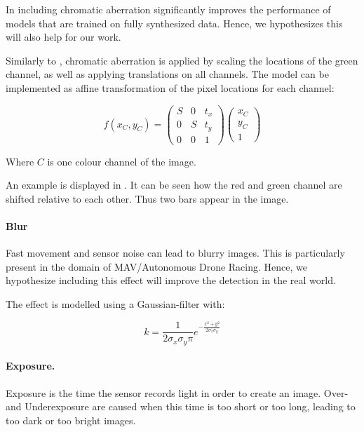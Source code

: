 In \cite{Carlson2018} including chromatic aberration significantly improves the performance of models that are trained on fully synthesized data. Hence, we hypothesizes this will also help for our work.

Similarly to \cite{Carlson2018}, chromatic aberration is applied by scaling the locations of the green channel, as well as applying translations on all channels. The model can be implemented as affine transformation of the pixel locations for each channel:

\begin{equation}
f(x_C,y_C) = \begin{pmatrix}
S & 0 & t_x \\
0 & S & t_y \\
0 & 0 & 1
\end{pmatrix} \begin{pmatrix}
x_C \\
y_C \\
1
\end{pmatrix}
\end{equation}

Where $C$ is one colour channel of the image.

An example is displayed in . It can be seen how the red and green channel are shifted relative to each other. Thus two bars appear in the image.

\paragraph{Blur}

Fast movement and sensor noise can lead to blurry images. This is particularly present in the domain of \ac{MAV}/Autonomous Drone Racing. Hence, we hypothesize including this effect will improve the detection in the real world. 

The effect is modelled using a Gaussian-filter with:

\begin{equation}
k = \frac{1}{2\sigma_x\sigma_y\pi}e^{-{\frac{x^2 + y^2}{2\sigma_x\sigma_y}}} 
\end{equation}
\paragraph{Exposure.}

Exposure is the time the sensor records light in order to create an image. Over- and Underexposure are caused when this time is too short or too long, leading to too dark or too bright images.

